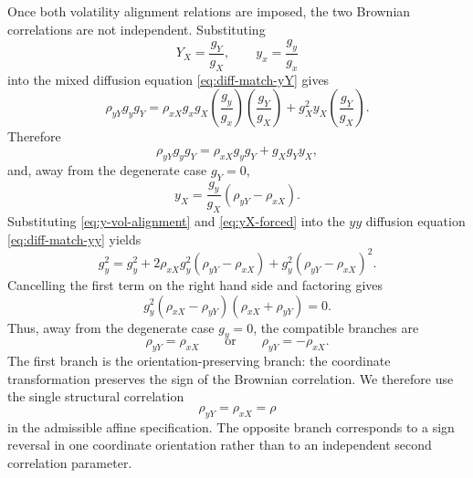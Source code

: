 \documentclass[11pt]{article}
\numberwithin{equation}{section}
\begin{document}
Once both volatility alignment relations are imposed, the two Brownian correlations are not independent. Substituting
\[
Y_X=\frac{g_Y}{g_X},
\qquad
 y_x=\frac{g_y}{g_x}
\]
into the mixed diffusion equation \eqref{eq:diff-match-yY} gives
\[
\rho_{yY}g_yg_Y
=
\rho_{xX}g_xg_X
\left(\frac{g_y}{g_x}\right)
\left(\frac{g_Y}{g_X}\right)
+
g_X^2y_X\left(\frac{g_Y}{g_X}\right).
\]
Therefore
\[
\rho_{yY}g_yg_Y=\rho_{xX}g_yg_Y+g_Xg_Yy_X,
\]
and, away from the degenerate case \(g_Y=0\),
\begin{equation}
\label{eq:yX-forced}
y_X
=
\frac{g_y}{g_X}\left(\rho_{yY}-\rho_{xX}\right).
\end{equation}
Substituting \eqref{eq:y-vol-alignment} and \eqref{eq:yX-forced} into the \(yy\) diffusion equation \eqref{eq:diff-match-yy} yields
\[
g_y^2
=
g_y^2
+
2\rho_{xX}g_y^2\left(\rho_{yY}-\rho_{xX}\right)
+
g_y^2\left(\rho_{yY}-\rho_{xX}\right)^2.
\]
Cancelling the first term on the right hand side and factoring gives
\begin{equation}
\label{eq:rho-branch-constraint}
g_y^2
\left(\rho_{xX}-\rho_{yY}\right)
\left(\rho_{xX}+\rho_{yY}\right)=0.
\end{equation}
Thus, away from the degenerate case \(g_y=0\), the compatible branches are
\begin{equation}
\label{eq:rho-branches}
\rho_{yY}=\rho_{xX}
\qquad\text{or}\qquad
\rho_{yY}=-\rho_{xX}.
\end{equation}
The first branch is the orientation-preserving branch: the coordinate transformation preserves the sign of the Brownian correlation. We therefore use the single structural correlation
\begin{equation}
\label{eq:single-rho-branch}
\rho_{yY}=\rho_{xX}=\rho
\end{equation}
in the admissible affine specification. The opposite branch corresponds to a sign reversal in one coordinate orientation rather than to an independent second correlation parameter.
\end{document}

